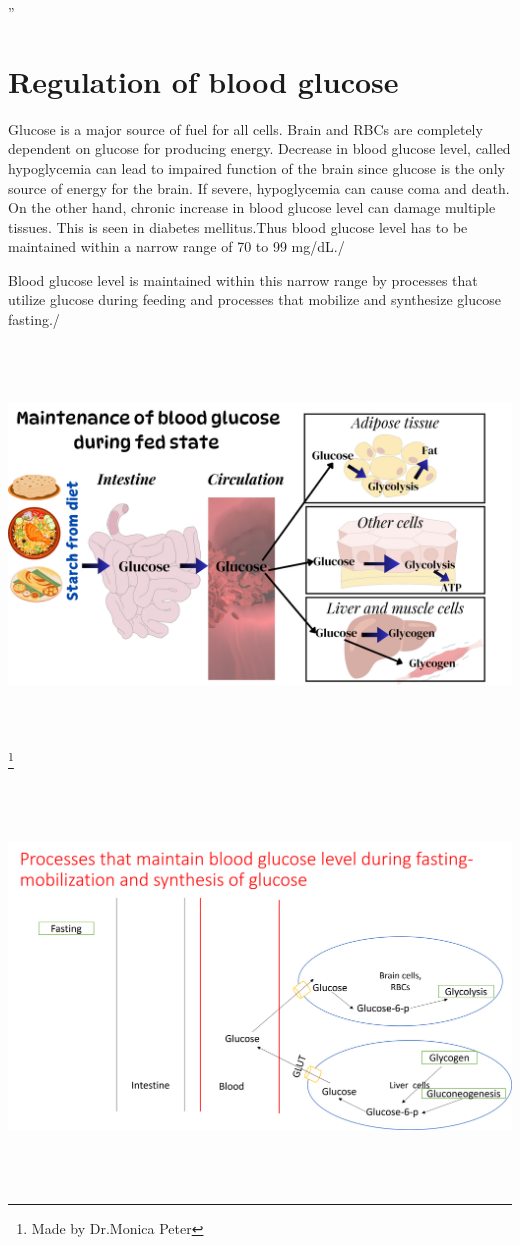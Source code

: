 \documentclass[
]{book}
\begin{document}
''

\chapter{Regulation of blood glucose}\label{regulation-of-blood-glucose}

Glucose is a major source of fuel for all cells. Brain and RBCs are completely dependent on glucose for producing energy. Decrease in blood glucose level, called hypoglycemia can lead to impaired function of the brain since glucose is the only source of energy for the brain. If severe, hypoglycemia can cause coma and death. On the other hand, chronic increase in blood glucose level can damage multiple tissues. This is seen in diabetes mellitus.Thus blood glucose level has to be maintained within a narrow range of 70 to 99 mg/dL./

Blood glucose level is maintained within this narrow range by processes that utilize glucose during feeding and processes that mobilize and synthesize glucose fasting./

\includegraphics[width=\textwidth,height=4.16667in]{Images/feeding.png}
\footnote{Made by Dr.Monica Peter}

\includegraphics[width=\textwidth,height=4.16667in]{Images/fasting.png}
\end{document}
